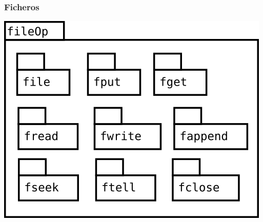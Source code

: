 \pagebreak
\subsubsection {Ficheros} 
\begin{center}
\includegraphics[scale=0.4]{fileOp-package.png} \\
\end{center}

